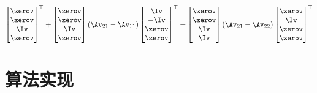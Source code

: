 \documentclass{ctexart}
\begin{document}
\begin{align*}
    \begin{bmatrix}
        \zerov \\ \zerov \\ \Iv \\ \zerov
    \end{bmatrix}^\top +
    \begin{bmatrix}
        \zerov \\ \zerov \\ \Iv \\ \zerov
    \end{bmatrix} (\Av_{21} - \Av_{11})
    \begin{bmatrix}
        \Iv \\ -\Iv \\ \zerov \\ \zerov
    \end{bmatrix}^\top +
    \begin{bmatrix}
        \zerov \\ \zerov \\ \Iv \\ \Iv
    \end{bmatrix} (\Av_{21} - \Av_{22})
    \begin{bmatrix}
        \zerov \\ \Iv \\ \zerov \\ \zerov
    \end{bmatrix}^\top
\end{align*}

\section{算法实现}
\end{document}
